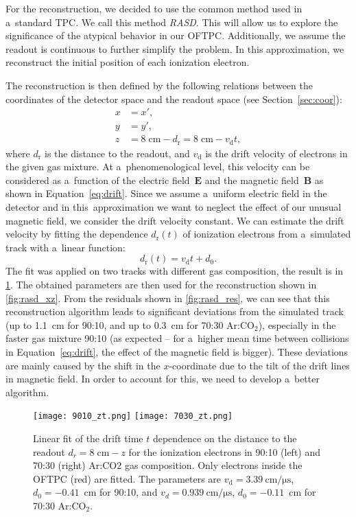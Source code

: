 		For the reconstruction, we decided to use the common method used in a~standard \ac{TPC}\cite{TPCs}. We call this method \textit{\acf{RASD}}. This will allow us to explore the significance of the atypical behavior in our \ac{OFTPC}. Additionally, we assume the readout is continuous to further simplify the problem. In this approximation, we reconstruct the initial position of each ionization electron.
		
		The reconstruction is then defined by the following relations between the coordinates of the detector space and the readout space (see Section~\ref{sec:coor}):
			\begin{align}
				x &= x',\\
				y &= y',\\
				z &= 8\;\text{cm} - d_\text{r} = 8\;\text{cm} - v_\text{d} t,
			\end{align}
		where $d_\text{r}$ is the distance to the readout, and $v_\text{d}$ is the drift velocity of electrons in the given gas mixture. At a~phenomenological level, this velocity can be considered as a~function of the electric field~$\mathbf{E}$ and the magnetic field~$\mathbf{B}$ as shown in Equation~\ref{eq:drift}. Since we assume a~uniform electric field in the detector and in this~approximation we want to neglect the effect of our unusual magnetic field, we consider the drift velocity constant. We can estimate the drift velocity by fitting the dependence $d_\text{r}(t)$ of ionization electrons from a~simulated track with a~linear function:
			\begin{equation}
				d_\text{r}(t) = v_\text{d} t + d_0.
			\end{equation}
		The fit was applied on two tracks with different gas composition, the result is in \cref{fig:zt}. The obtained parameters are then used for the reconstruction shown in \cref{fig:rasd_xz}. From the residuals shown in \cref{fig:rasd_res}, we can see that this reconstruction algorithm leads to significant deviations from the simulated track (up to 1.1~cm for 90:10, and up to 0.3~cm for 70:30 Ar:CO$_2$), especially in the faster gas mixture 90:10 (as expected -- for a~higher mean time between collisions in Equation~\ref{eq:drift}, the effect of the magnetic field is bigger). These deviations are mainly caused by the shift in the $x$\nobreakdash-coordinate due to the tilt of the drift lines in magnetic field. In order to account for this, we need to develop a~better algorithm.
		
		\begin{figure}
			\centering
			\texttt{[image: 9010\_zt.png]}
			\hfill
			\texttt{[image: 7030\_zt.png]}
			\caption{Linear fit of the drift time $t$ dependence on the distance to the readout $d_r = 8\;\text{cm} - z$ for the ionization electrons in 90:10 (left) and 70:30 (right) Ar:CO$2$ gas composition. Only electrons inside the \ac{OFTPC} (red) are fitted. The parameters are $v_\text{d} = \qty{3.39}{\centi\meter\per\micro\second}$, $d_0 = -0.41$~cm for 90:10, and $v_d = \qty{0.939}{\centi\meter\per\micro\second}$, $d_0 = -0.11$~cm for 70:30 Ar:CO$_2$.}
			\label{fig:zt}
		\end{figure}
		
